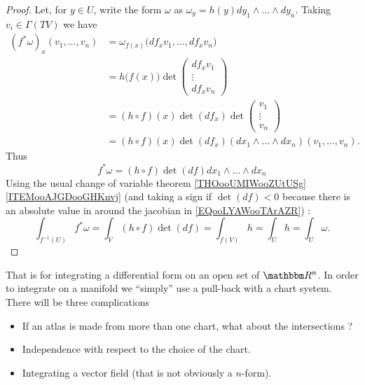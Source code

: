 \begin{proof}
    Let, for \( y\in U\), write the form \( \omega\) as \( \omega_y=h(y)dy_1\wedge\ldots\wedge dy_n\). Taking \( v_i\in \Gamma(TV)\) we have
    \begin{subequations}
        \begin{align}
            (f^*\omega)_x(v_1,\ldots, v_n)&=\omega_{f(x)}\big( df_xv_1,\ldots, df_xv_n \big)\\
            &=h\big( f(x) \big)\det\begin{pmatrix}
                df_xv_1    \\ 
                \vdots    \\ 
                df_xv_n    
            \end{pmatrix}\\
            &=(h\circ f)(x)\det(df_x)\det\begin{pmatrix}
                v_1    \\ 
                \vdots    \\ 
                v_n    
            \end{pmatrix}\\
            &=(h\circ f)(x)\det(df_x)(dx_1\wedge\ldots\wedge dx_n)(v_1,\ldots, v_n).
        \end{align}
    \end{subequations}
    Thus
    \begin{equation}
        f^*\omega= (h\circ f)\det(df)dx_1\wedge\ldots\wedge dx_n
    \end{equation}
    Using the usual change of variable theorem \ref{THOooUMIWooZUtUSg}\ref{ITEMooAJGDooGHKnvj} (and taking a sign if \( \det(df)<0\) because there is an absolute value in around the jacobian in \eqref{EQooLYAWooTArAZR}) :
    \begin{equation}
        \int_{f^{-1}(U)}f^*\omega=\int_V(h\circ f)\det(df)=\int_{f(V)}h=\int_Uh=\int_U\omega.
    \end{equation}
\end{proof}

That is for integrating a differential form on an open set of \( \eR^n\). In order to integrate on a manifold we ``simply'' use a pull-back with a chart system. There will be three complications
\begin{itemize}
    \item If an atlas is made from more than one chart, what about the intersections ?
    \item Independence with respect to the choice of the chart.
    \item Integrating a vector field (that is not obviously a \( n\)-form).
\end{itemize}

